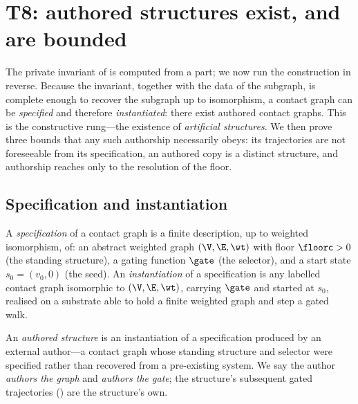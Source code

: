 
\section{T8: authored structures exist, and are bounded}
\label{sec:construct}

The private invariant of  is computed from a part; we now
run the construction in reverse. Because the invariant, together with the data of
the subgraph, is complete enough to recover the subgraph up to isomorphism, a
contact graph can be \emph{specified} and therefore \emph{instantiated}: there
exist authored contact graphs. This is the constructive rung---the existence of
\emph{artificial structures}. We then prove three bounds that any such authorship
necessarily obeys: its trajectories are not foreseeable from its specification,
an authored copy is a distinct structure, and authorship reaches only to the
resolution of the floor.

\subsection{Specification and instantiation}

\begin{definition}[Specification]
\label{def:spec}
A \emph{specification} of a contact graph is a finite description, up to weighted
isomorphism, of: an abstract weighted graph $(\V,\E,\wt)$ with floor $\floorc>0$
(the standing structure), a gating function $\gate$ (the selector), and a start
state $s_0=(v_0,0)$ (the seed). An \emph{instantiation} of a specification is any
labelled contact graph isomorphic to $(\V,\E,\wt)$, carrying $\gate$ and started
at $s_0$, realised on a substrate able to hold a finite weighted graph and step a
gated walk.
\end{definition}

\begin{definition}
\label{def:authored}
An \emph{authored structure} is an instantiation of a specification produced by
an external author---a contact graph whose standing structure and selector were
specified rather than recovered from a pre-existing system. We say the author
\emph{authors the graph} and \emph{authors the gate}; the structure's subsequent
gated trajectories \textup{(}\textup{)} are the structure's
own.
\end{definition}

